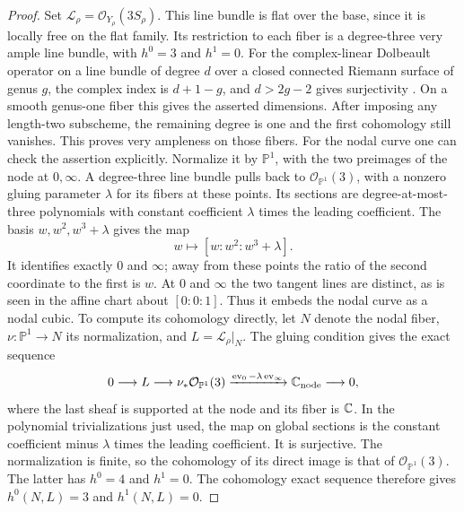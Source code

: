 \begin{proof}
Set \(\mathcal L_\rho=\mathcal O_{Y_\rho}(3S_\rho)\).
This line bundle is flat over the base, since it is locally free on
the flat family.
Its restriction to each fiber is a degree-three very ample line
bundle, with \(h^0=3\) and \(h^1=0\).
For the complex-linear Dolbeault operator on a line bundle of
degree \(d\) over a closed connected Riemann surface of genus \(g\), the complex
index is \(d+1-g\), and \(d>2g-2\) gives surjectivity
\cite[Section~3.4, Theorems~3.22--3.23]{Wendl2014Lectures}.
On a smooth genus-one fiber this gives the asserted dimensions.
After imposing any length-two subscheme, the remaining degree is
one and the first cohomology still vanishes.  This proves very
ampleness on those fibers.
For the nodal curve one can check the assertion explicitly.
Normalize it by \(\mathbb P^1\), with the two preimages of the
node at \(0,\infty\).  A degree-three line bundle pulls back to
\(\mathcal O_{\mathbb P^1}(3)\), with a nonzero gluing parameter
\(\lambda\) for its fibers at these points.
Its sections are degree-at-most-three polynomials with
constant coefficient \(\lambda\) times the leading coefficient.
The basis \(w,w^2,w^3+\lambda\) gives the map
\[
 w\longmapsto[w:w^2:w^3+\lambda].
\]
It identifies exactly \(0\) and \(\infty\); away from these
points the ratio of the second coordinate to the first is \(w\).
At \(0\) and \(\infty\) the two tangent lines are distinct, as
is seen in the affine chart about \([0:0:1]\).
Thus it embeds the nodal curve as a nodal cubic.  To compute its
cohomology directly, let \(N\) denote the nodal fiber,
\(\nu:\mathbb P^1\to N\) its normalization, and
\(L=\mathcal L_\rho|_N\).  The gluing condition gives the exact sequence
\[
 0\longrightarrow L\longrightarrow
 \nu_*\mathcal O_{\mathbb P^1}(3)
 \xrightarrow{\operatorname{ev}_0-\lambda\operatorname{ev}_\infty}
 \mathbb C_{\mathrm{node}}\longrightarrow0,
\]
where the last sheaf is supported at the node and its fiber is \(\mathbb C\).
In the polynomial trivializations just used, the map on global
sections is the constant coefficient minus \(\lambda\) times the
leading coefficient.  It is surjective.  The normalization is finite,
so the cohomology of its direct image is that of
\(\mathcal O_{\mathbb P^1}(3)\).  The latter has \(h^0=4\) and
\(h^1=0\).  The cohomology exact sequence therefore gives
\(h^0(N,L)=3\) and \(h^1(N,L)=0\).


\end{proof}
